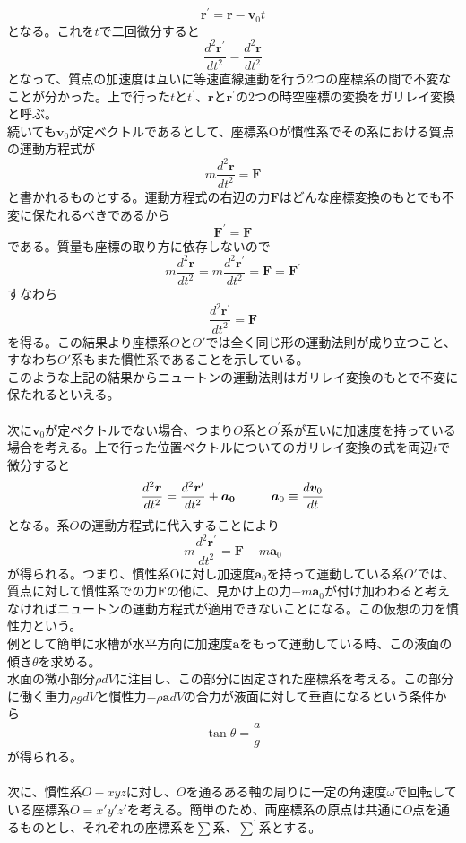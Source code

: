 \documentclass{jsarticle}
\begin{document}
\[\bm{r}^{\prime}=\bm{r}-\bm{v}_{0}t\]
となる。これを\(t\)で二回微分すると
\[\frac{d^2\bm{r}^{\prime}}{dt^2}=\frac{d^2\bm{r}}{dt^2}\]
となって、質点の加速度は互いに等速直線運動を行う2つの座標系の間で不変なことが分かった。上で行った\(t\)と\(t^{\prime}\)、\(\bm{r}\)と\(\bm{r}^{\prime}\)の2つの時空座標の変換をガリレイ変換と呼ぶ。\\
続いても\(\bm{v}_{0}\)が定ベクトルであるとして、座標系Oが慣性系でその系における質点の運動方程式が
\[m\frac{d^2\bm{r}}{dt^2}=\bm{F}\]
と書かれるものとする。運動方程式の右辺の力\(\bm{F}\)はどんな座標変換のもとでも不変に保たれるべきであるから
\[\bm{F}^{\prime}=\bm{F}\]
である。質量も座標の取り方に依存しないので
\[m\frac{d^2\bm{r}}{dt^2}=m\frac{d^2\bm{r}^{\prime}}{dt^2}=\bm{F}=\bm{F}^{\prime}\]
すなわち
\[\frac{d^2\bm{r}^{\prime}}{dt^2}=\bm{F}\]
を得る。この結果より座標系\(O\)と\(O'\)では全く同じ形の運動法則が成り立つこと、すなわち\(O'\)系もまた慣性系であることを示している。\\
このような上記の結果からニュートンの運動法則はガリレイ変換のもとで不変に保たれるといえる。\\
\\
次に\(\bm{v}_{0}\)が定ベクトルでない場合、つまり\(O\)系と\(O^{\prime}\)系が互いに加速度を持っている場合を考える。上で行った位置ベクトルについてのガリレイ変換の式を両辺\(t\)で微分すると
\[\frac{d^2\bm{r}}{dt^2}=\frac{d^2\bm{r}^{\prime}}{dt^2}+\bm{a_{0}}\hspace{10mm}\bm{a}_{0}\equiv\frac{d\bm{v}_{0}}{dt}\]
となる。系\(O\)の運動方程式に代入することにより
\[m\frac{d^2\bm{r}^{\prime}}{dt^2}=\bm{F}-m\bm{a}_{0}\]
が得られる。つまり、慣性系Oに対し加速度\(\bm{a}_{0}\)を持って運動している系\(O'\)では、質点に対して慣性系での力\(\bm{F}\)の他に、見かけ上の力\(-m\bm{a}_{0}\)が付け加わわると考えなければニュートンの運動方程式が適用できないことになる。この仮想の力を慣性力という。\\
例として簡単に水槽が水平方向に加速度\(\bm{a}\)をもって運動している時、この液面の傾き\(\theta\)を求める。\\
水面の微小部分\(\rho dV\)に注目し、この部分に固定された座標系を考える。この部分に働く重力\(\rho gdV\)と慣性力\(-\rho\bm{a}dV\)の合力が液面に対して垂直になるという条件から
\[\tan\theta=\frac{a}{g}\]が得られる。\\
\\
次に、慣性系\(O-xyz\)に対し、\(O\)を通るある軸の周りに一定の角速度\(\omega\)で回転している座標系\(O=x'y'z'\)を考える。簡単のため、両座標系の原点は共通に\(O\)点を通るものとし、それぞれの座標系を\(\sum\)系、\(\sum^{\prime}\)系とする。\\
\end{document}
